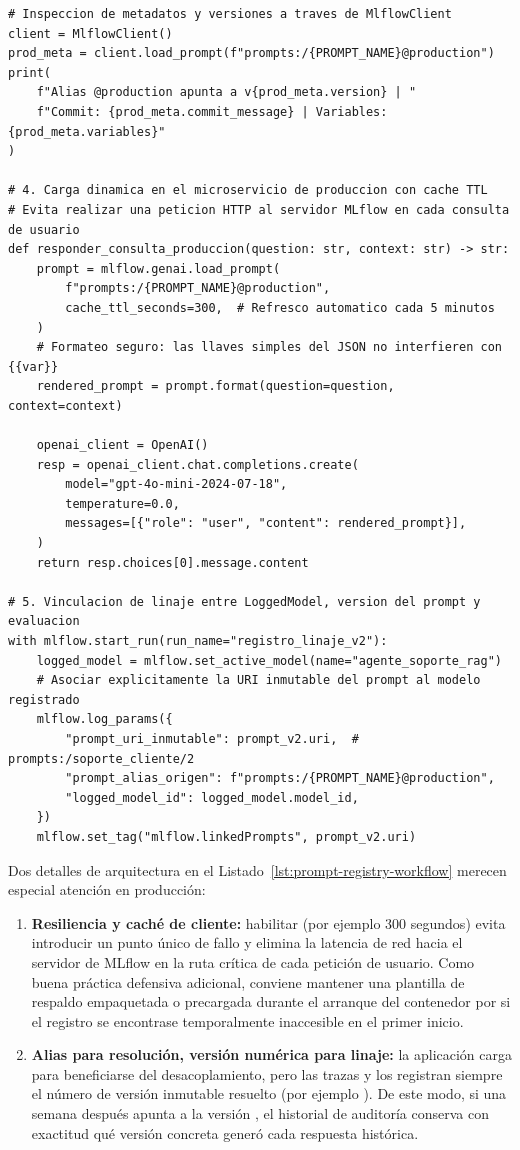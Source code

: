 \begin{lstlisting}
# Inspeccion de metadatos y versiones a traves de MlflowClient
client = MlflowClient()
prod_meta = client.load_prompt(f"prompts:/{PROMPT_NAME}@production")
print(
    f"Alias @production apunta a v{prod_meta.version} | "
    f"Commit: {prod_meta.commit_message} | Variables: {prod_meta.variables}"
)

# 4. Carga dinamica en el microservicio de produccion con cache TTL
# Evita realizar una peticion HTTP al servidor MLflow en cada consulta de usuario
def responder_consulta_produccion(question: str, context: str) -> str:
    prompt = mlflow.genai.load_prompt(
        f"prompts:/{PROMPT_NAME}@production",
        cache_ttl_seconds=300,  # Refresco automatico cada 5 minutos
    )
    # Formateo seguro: las llaves simples del JSON no interfieren con {{var}}
    rendered_prompt = prompt.format(question=question, context=context)

    openai_client = OpenAI()
    resp = openai_client.chat.completions.create(
        model="gpt-4o-mini-2024-07-18",
        temperature=0.0,
        messages=[{"role": "user", "content": rendered_prompt}],
    )
    return resp.choices[0].message.content

# 5. Vinculacion de linaje entre LoggedModel, version del prompt y evaluacion
with mlflow.start_run(run_name="registro_linaje_v2"):
    logged_model = mlflow.set_active_model(name="agente_soporte_rag")
    # Asociar explicitamente la URI inmutable del prompt al modelo registrado
    mlflow.log_params({
        "prompt_uri_inmutable": prompt_v2.uri,  # prompts:/soporte_cliente/2
        "prompt_alias_origen": f"prompts:/{PROMPT_NAME}@production",
        "logged_model_id": logged_model.model_id,
    })
    mlflow.set_tag("mlflow.linkedPrompts", prompt_v2.uri)
\end{lstlisting}

Dos detalles de arquitectura en el Listado~\ref{lst:prompt-registry-workflow} merecen especial atención en producción:
\begin{enumerate}
  \item \textbf{Resiliencia y caché de cliente:} habilitar  (por ejemplo 300 segundos) evita introducir un punto único de fallo y elimina la latencia de red hacia el servidor de MLflow en la ruta crítica de cada petición de usuario. Como buena práctica defensiva adicional, conviene mantener una plantilla de respaldo empaquetada o precargada durante el arranque del contenedor por si el registro se encontrase temporalmente inaccesible en el primer inicio.
  \item \textbf{Alias para resolución, versión numérica para linaje:} la aplicación carga  para beneficiarse del desacoplamiento, pero las trazas y los  registran siempre el número de versión inmutable resuelto (por ejemplo ). De este modo, si una semana después  apunta a la versión , el historial de auditoría conserva con exactitud qué versión concreta generó cada respuesta histórica.
\end{enumerate}

